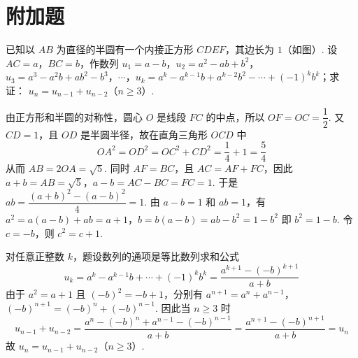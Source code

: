 \documentclass[UTF8,a4paper,oneside,11pt]{ctexbook}
\begin{document}
\section{附加题}

\begin{problem}
已知以 \(AB\) 为直径的半圆有一个内接正方形 \(CDEF\)，其边长为 \(1\)（如图）. 设 \(AC = a\)，\(BC = b\)，作数列 \(u_1 = a - b\)，\(u_2 = a^2 - ab + b^2\)，\(u_3 = a^3 - a^2b + ab^2 - b^3\)，\(\cdots\)，\(u_k = a^k - a^{k-1}b + a^{k-2}b^2 - \cdots + (-1)^k b^k\)；求证： \(u_n = u_{n-1} + u_{n-2}\)（\(n \geqslant 3\)）.

\end{problem}

\begin{solution}
由正方形和半圆的对称性，圆心 \(O\) 是线段 \(FC\) 的中点，所以 \(OF=OC=\dfrac12\). 又 \(CD=1\)，且 \(OD\) 是半圆半径，故在直角三角形 \(OCD\) 中
\[
OA^2=OD^2=OC^2+CD^2=\frac14+1=\frac54
\]
从而 \(AB=2OA=\sqrt5\). 同时 \(AF=BC\)，且 \(AC=AF+FC\)，因此
\(a+b=AB=\sqrt5\)，\(a-b=AC-BC=FC=1\).
于是 \(ab=\dfrac{(a+b)^2-(a-b)^2}{4}=1\). 由 \(a-b=1\) 和 \(ab=1\)，有
\(a^2=a(a-b)+ab=a+1\)，\(b=b(a-b)=ab-b^2=1-b^2\)
即 \(b^2=1-b\). 令 \(c=-b\)，则 \(c^2=c+1\).

对任意正整数 \(k\)，题设数列的通项是等比数列求和公式
\[
u_k=a^k-a^{k-1}b+\cdots+(-1)^kb^k
=\frac{a^{k+1}-(-b)^{k+1}}{a+b}
\]
由于 \(a^2=a+1\) 且 \((-b)^2=-b+1\)，分别有
\(a^{n+1}=a^n+a^{n-1}\)，\((-b)^{n+1}=(-b)^n+(-b)^{n-1}\).
因此当 \(n\geqslant3\) 时
\[
u_{n-1}+u_{n-2}
=\frac{a^n-(-b)^n+a^{n-1}-(-b)^{n-1}}{a+b}
=\frac{a^{n+1}-(-b)^{n+1}}{a+b}
=u_n
\]
故 \(u_n=u_{n-1}+u_{n-2}\)（\(n\geqslant3\)）.
\end{solution}

\end{document}
